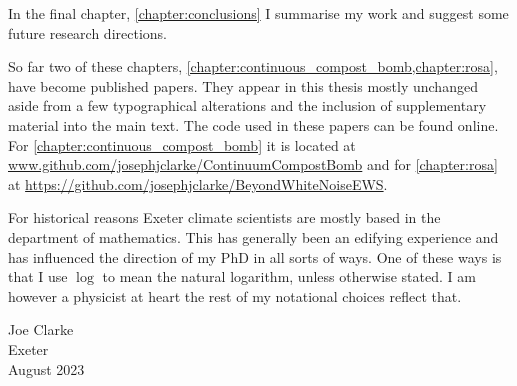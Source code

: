 In the final chapter, \cref{chapter:conclusions} I summarise my work and suggest some future research directions.

So far two of these chapters, \cref{chapter:continuous_compost_bomb,chapter:rosa}, have become published papers. They appear in this thesis mostly unchanged
aside from a few typographical alterations and the inclusion of supplementary material into the main text. The code used in these papers can be found online. 
For \cref{chapter:continuous_compost_bomb} it is located at \url{www.github.com/josephjclarke/ContinuumCompostBomb} and for
\cref{chapter:rosa} at \url{https://github.com/josephjclarke/BeyondWhiteNoiseEWS}.

For historical reasons Exeter climate scientists are mostly based in the department of mathematics. This has generally been an edifying experience and has influenced the
direction of my PhD in all sorts of ways. One of these ways is that I use $\log$ to mean the natural logarithm, unless otherwise stated. I am however a physicist
at heart the rest of my notational choices reflect that.

\begin{flushright}
  Joe Clarke\\
  Exeter\\
  August 2023
\end{flushright}